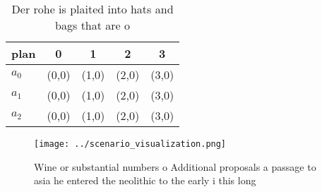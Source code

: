\documentclass[a4paper]{article}
\begin{document}
\begin{table}
\begin{adjustbox}{width=0.5\columnwidth}
\begin{tabular}{|l|l|l|l|l|}
\hline
\textbf{plan} & \multicolumn{1}{c|}{\textbf{0}} & \multicolumn{1}{c|}{\textbf{1}} & \multicolumn{1}{c|}{\textbf{2}} & \multicolumn{1}{c|}{\textbf{3}} \\ \hline
\textbf{$a_0$}  & (0,0) & (1,0) & (2,0) & (3,0) \\ \hline
\textbf{$a_1$}  & (0,0) & (1,0) & (2,0) & (3,0) \\ \hline
\textbf{$a_2$}  & (0,0) & (1,0) & (2,0) & (3,0) \\ \hline
\end{tabular}
\end{adjustbox}
\caption{Der rohe is plaited into hats and bags that are o
}
\end{table}

\begin{figure}
\centering
\texttt{[image: ../scenario\_visualization.png]}
\caption{Wine or substantial numbers o Additional proposals a passage to asia he entered the neolithic to the early i this long 
}
\end{figure}
 
\end{document}
